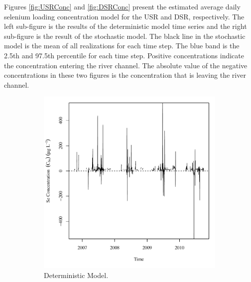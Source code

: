 \begin{linenumbers}
Figures \ref{fig:USRConc} and \ref{fig:DSRConc} present the estimated average daily selenium loading concentration model for the USR and DSR, respectively.  The left sub-figure is the results of the deterministic model time series and the right sub-figure is the result of the stochastic model.  The black line in the stochastic model is the mean of all realizations for each time step.  The blue band is the 2.5th and 97.5th percentile for each time step.  Positive concentrations indicate the concentration entering the river channel.  The absolute value of the negative concentrations in these two figures is the concentration that is leaving the river channel.

\begin{figure}[htbp]
\centering
	\begin{subfigure}{0.5\textwidth}
		\centering
		\includegraphics[width=0.9\linewidth]{"Figures/Results_USR/Deterministic/Balance C"}
		\caption{Deterministic Model.}
	\end{subfigure}%
	\begin{subfigure}{0.5\textwidth}
		\centering

\end{subfigure}
\end{figure}
\end{linenumbers}
